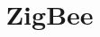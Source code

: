 \documentclass[10pt,journal,compsoc]{IEEEtran}
\begin{document}
%
\title{ZigBee}
%
%
%
%



% 
%
\end{document}
